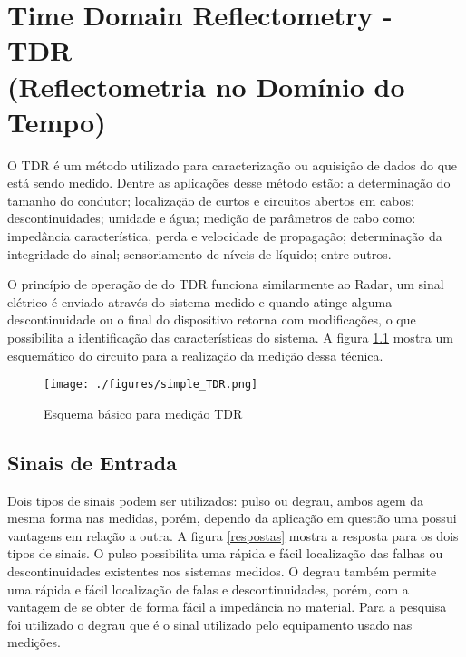 \chapter{Time Domain Reflectometry - TDR \\ (Reflectometria no Domínio do Tempo)}

\label{TDR}

O TDR é um método utilizado para caracterização ou aquisição de dados do que está sendo medido. Dentre as aplicações desse método estão: a determinação do tamanho do condutor; localização de curtos e circuitos abertos em cabos; descontinuidades; umidade e água; medição de parâmetros de cabo como: impedância característica, perda e velocidade de propagação; determinação da integridade do sinal; sensoriamento de níveis de líquido; entre outros.

O princípio de operação de do TDR funciona similarmente ao Radar, um sinal elétrico é enviado através do sistema medido e quando atinge alguma descontinuidade ou o final do dispositivo retorna com modificações, o que possibilita a identificação das características do sistema.  A figura \ref{circuito_TDR} mostra um esquemático do circuito para a realização da medição dessa técnica.

\begin{figure}[htb!]
	\begin{center}
		\texttt{[image: ./figures/simple\_TDR.png]}
		\caption{Esquema básico para medição TDR}
		\label{circuito_TDR}
	\end{center}
\end{figure}

\section{Sinais de Entrada}

Dois tipos de sinais podem ser utilizados: pulso ou degrau, ambos agem da mesma forma nas medidas, porém, dependo da aplicação em questão uma possui vantagens em relação a outra. A figura \ref{respostas} mostra a resposta para os dois tipos de sinais. O pulso possibilita uma rápida e fácil localização das falhas ou descontinuidades existentes nos sistemas medidos. O degrau também permite uma rápida e fácil localização de falas e descontinuidades, porém, com a vantagem de se obter de forma fácil a impedância no material. Para a pesquisa foi utilizado o degrau que é o sinal utilizado pelo equipamento usado nas medições.

